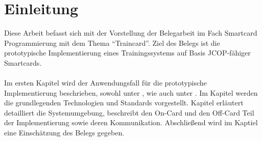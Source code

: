 \section{Einleitung}
\label{sec:0}
Diese Arbeit befasst sich mit der Vorstellung der Belegarbeit im Fach Smartcard Programmierung mit dem Thema ``Traincard''. 
Ziel des Belegs ist die prototypische Implementierung eines Trainingssystems auf Basis JCOP-fähiger Smartcards. 
\\
\\
Im ersten Kapitel  wird der Anwendungsfall für die prototypische Implementierung beschrieben, sowohl unter , wie auch unter . Im Kapitel  werden die grundlegenden Technologien und Standards vorgestellt.  Kapitel  erläutert detailliert die Systemumgebung, beschreibt den On-Card und den Off-Card Teil der Implementierung sowie deren Kommunikation. Abschließend wird im Kaptiel  eine Einschätzung des Belegs gegeben. 